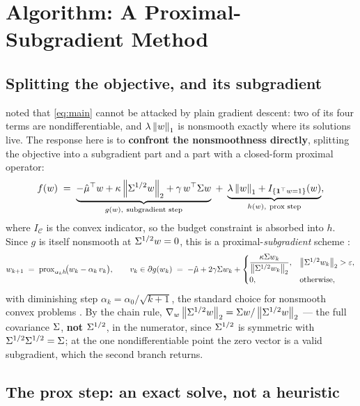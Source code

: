 \section{Algorithm: A Proximal-Subgradient Method}\label{sec:algorithm}

\subsection{Splitting the objective, and its subgradient}

 noted that \cref{eq:main} cannot be attacked by plain gradient descent: two
of its four terms are nondifferentiable, and $\lambda\left\lVert w \right\rVert_1$ is nonsmooth exactly where its
solutions live. The response here is to \textbf{confront the nonsmoothness directly}, splitting
the objective into a subgradient part and a part with a closed-form proximal operator:
\begin{equation}\label{eq:split}
f(w) \;=\; \underbrace{-\hat{\mu}^\top w + \kappa\left\lVert \Sigma^{1/2} w \right\rVert_2 + \gamma\, w^\top\Sigma w}_{g(w),
\ \text{subgradient step}}
\;+\; \underbrace{\lambda\left\lVert w \right\rVert_1 + I_{\{\mathbf{1}^\top w = 1\}}(w)}_{h(w),\ \text{prox step}} ,
\end{equation}
where $I_{\mathcal{C}}$ is the convex indicator, so the budget constraint is absorbed into $h$.
Since $g$ is itself nonsmooth at $\Sigma^{1/2} w = 0$, this is a proximal-\emph{subgradient} scheme
\citep{parikh2014}:
\begin{equation}\label{eq:iteration}
w_{k+1} \;=\; \operatorname{prox}_{\alpha_k h}\!\bigl(w_k - \alpha_k\, v_k\bigr),
\qquad v_k \in \partial g(w_k) \;=\; -\hat{\mu} + 2\gamma\Sigma w_k +
\begin{cases}
\dfrac{\kappa\Sigma w_k}{\left\lVert \Sigma^{1/2} w_k \right\rVert_2}, & \left\lVert \Sigma^{1/2} w_k \right\rVert_2 > \varepsilon,\\[4pt]
0, & \text{otherwise,}
\end{cases}
\end{equation}
with diminishing step $\alpha_k = \alpha_0/\sqrt{k+1}$, the standard choice for nonsmooth convex
problems \citep{boyd2004}. By the chain rule, $\nabla_w\left\lVert \Sigma^{1/2} w \right\rVert_2 = \Sigma w/\left\lVert \Sigma^{1/2} w \right\rVert_2$
--- the full covariance $\Sigma$, \textbf{not} $\Sigma^{1/2}$, in the numerator, since $\Sigma^{1/2}$ is
symmetric with $\Sigma^{1/2}\Sigma^{1/2} = \Sigma$; at the one nondifferentiable point the zero vector is a
valid subgradient, which the second branch returns.

\subsection{The prox step: an exact solve, not a heuristic}\label{sec:prox}

